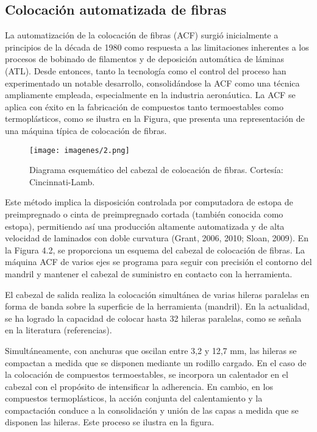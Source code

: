 \subsection{Colocación automatizada de fibras}
La automatización de la colocación de fibras (ACF) surgió inicialmente a principios de la década de 1980 como respuesta a las limitaciones inherentes a los procesos de bobinado de filamentos y de deposición automática de láminas (ATL). Desde entonces, tanto la tecnología como el control del proceso han experimentado un notable desarrollo, consolidándose la ACF como una técnica ampliamente empleada, especialmente en la industria aeronáutica. La ACF se aplica con éxito en la fabricación de compuestos tanto termoestables como termoplásticos, como se ilustra en la Figura, que presenta una representación de una máquina típica de colocación de fibras.
 \begin{figure}[h]
    \centering
    \texttt{[image: imagenes/2.png]}
    \caption{Diagrama esquemático del cabezal de colocación de fibras. Cortesía: Cincinnati-Lamb.}
    \label{fig:enter-label}
\end{figure}
Este método implica la disposición controlada por computadora de estopa de preimpregnado o cinta de preimpregnado cortada (también conocida como estopa), permitiendo así una producción altamente automatizada y de alta velocidad de laminados con doble curvatura (Grant, 2006, 2010; Sloan, 2009). En la Figura 4.2, se proporciona un esquema del cabezal de colocación de fibras. La máquina ACF de varios ejes se programa para seguir con precisión el contorno del mandril y mantener el cabezal de suministro en contacto con la herramienta.

El cabezal de salida realiza la colocación simultánea de varias hileras paralelas en forma de banda sobre la superficie de la herramienta (mandril). En la actualidad, se ha logrado la capacidad de colocar hasta 32 hileras paralelas, como se señala en la literatura (referencias).

Simultáneamente, con anchuras que oscilan entre 3,2 y 12,7 mm, las hileras se compactan a medida que se disponen mediante un rodillo cargado. En el caso de la colocación de compuestos termoestables, se incorpora un calentador en el cabezal con el propósito de intensificar la adherencia. En cambio, en los compuestos termoplásticos, la acción conjunta del calentamiento y la compactación conduce a la consolidación y unión de las capas a medida que se disponen las hileras. Este proceso se ilustra en la figura. 

